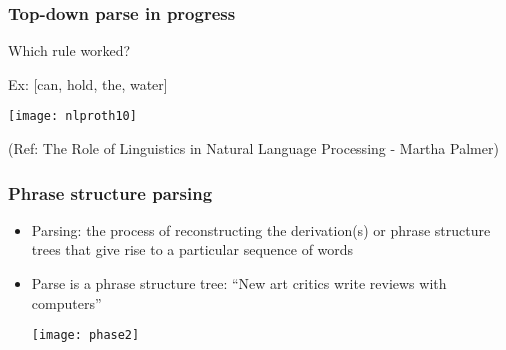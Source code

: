 \begin{frame}[fragile]
  \frametitle{Top-down parse in progress}
Which rule worked?

Ex: [can, hold, the, water]

  \begin{center}
\texttt{[image: nlproth10]}
\end{center}

(Ref: The Role of Linguistics in  Natural Language Processing - 
Martha Palmer)
 \end{frame}
 
 
 

%


\begin{frame}[fragile]
  \frametitle{Phrase structure parsing}
  \begin{itemize}
  \item Parsing: the process of reconstructing the derivation(s) or phrase structure trees that give rise to a particular sequence of words
  \item Parse is a phrase structure tree:
``New art critics write reviews with computers''
  \begin{center}
\texttt{[image: phase2]}
\end{center}
  \end{itemize}
\end{frame}

